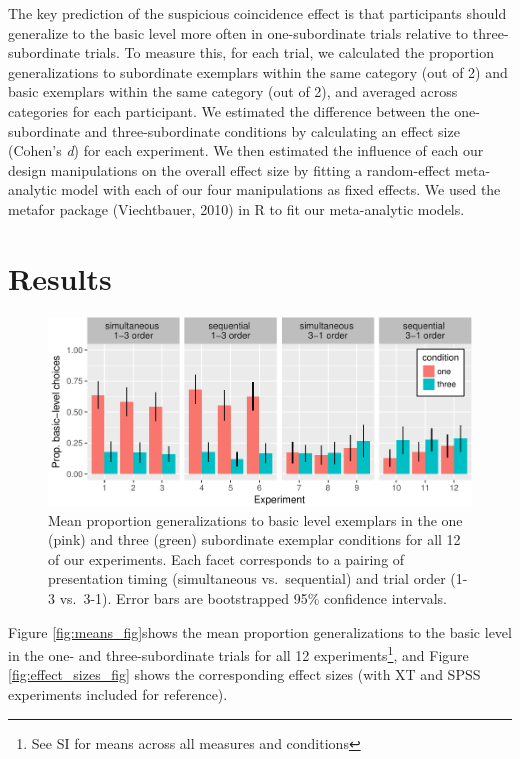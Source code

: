 \documentclass[english,floatsintext,man]{apa6}
\theoremstyle{definition}
\theoremstyle{definition}
\theoremstyle{remark}
\begin{document}
The key prediction of the suspicious coincidence effect is that
participants should generalize to the basic level more often in
one-subordinate trials relative to three-subordinate trials. To measure
this, for each trial, we calculated the proportion generalizations to
subordinate exemplars within the same category (out of 2) and basic
exemplars within the same category (out of 2), and averaged across
categories for each participant. We estimated the difference between the
one-subordinate and three-subordinate conditions by calculating an
effect size (Cohen's \emph{d}) for each experiment. We then estimated
the influence of each our design manipulations on the overall effect
size by fitting a random-effect meta-analytic model with each of our
four manipulations as fixed effects. We used the metafor package
(Viechtbauer, 2010) in R to fit our meta-analytic models.

\section{Results}\label{results}

\begin{figure}
\centering
\includegraphics{xtmem_files/figure-latex/unnamed-chunk-3-1.pdf}
\caption{\label{fig:unnamed-chunk-3}Mean proportion generalizations to basic
level exemplars in the one (pink) and three (green) subordinate exemplar
conditions for all 12 of our experiments. Each facet corresponds to a
pairing of presentation timing (simultaneous vs.~sequential) and trial
order (1-3 vs.~3-1). Error bars are bootstrapped 95\% confidence
intervals.}
\end{figure}

Figure \ref{fig:means_fig}shows the mean proportion generalizations to
the basic level in the one- and three-subordinate trials for all 12
experiments\footnote{See SI for means across all measures and conditions},
and Figure \ref{fig:effect_sizes_fig} shows the corresponding effect
sizes (with XT and SPSS experiments included for reference).
\end{document}
